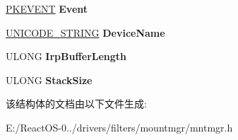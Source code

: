\begin{DoxyCompactItemize}
\hyperlink{struct___k_e_v_e_n_t}{P\+K\+E\+V\+E\+NT} {\bfseries Event}
\item 
\mbox{\label{struct___u_n_i_q_u_e___i_d___w_o_r_k___i_t_e_m_a89e73bc9ffb54baa328b681efdc3437f}} 
\hyperlink{struct___u_n_i_c_o_d_e___s_t_r_i_n_g}{U\+N\+I\+C\+O\+D\+E\+\_\+\+S\+T\+R\+I\+NG} {\bfseries Device\+Name}
\item 
\mbox{\label{struct___u_n_i_q_u_e___i_d___w_o_r_k___i_t_e_m_a06ddbb0269e346afd32e03329ab5390f}} 
U\+L\+O\+NG {\bfseries Irp\+Buffer\+Length}
\item 
\mbox{\label{struct___u_n_i_q_u_e___i_d___w_o_r_k___i_t_e_m_a7878df73600a91dd42fd38558a93f96e}} 
U\+L\+O\+NG {\bfseries Stack\+Size}
\end{DoxyCompactItemize}


该结构体的文档由以下文件生成\+:\begin{DoxyCompactItemize}
\item 
E\+:/\+React\+O\+S-\/0../drivers/filters/mountmgr/mntmgr.\+h\end{DoxyCompactItemize}
